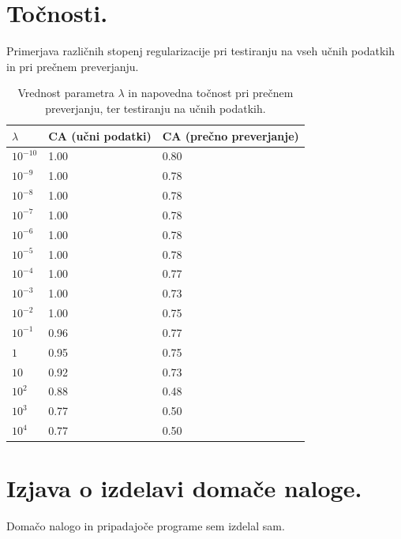 \documentclass[a4paper,11pt]{article}
\begin{document}
	

\section{Točnosti.} Primerjava različnih stopenj regularizacije pri testiranju na vseh učnih podatkih in pri prečnem preverjanju.
\begin{table}[htbp]
	\caption{Vrednost parametra $\lambda$ in napovedna točnost pri prečnem preverjanju, ter testiranju na učnih podatkih.}
	\label{tab1}
	\begin{center}
		\begin{tabular}{llp{4.3cm}}
			\hline
			 $\lambda$ & CA (učni podatki) & CA (prečno preverjanje) \\
			\hline
			$10^{-10}$ & 1.00  & 0.80 \\
			$10^{-9}$ & 1.00  & 0.78 \\
			$10^{-8}$ & 1.00  & 0.78 \\
			$10^{-7}$ & 1.00  & 0.78 \\
			$10^{-6}$ & 1.00  & 0.78 \\
			$10^{-5}$ & 1.00  & 0.78 \\
			$10^{-4}$ & 1.00  & 0.77 \\
			$10^{-3}$ & 1.00  & 0.73 \\
			$10^{-2}$ & 1.00  & 0.75 \\
			$10^{-1}$ & 0.96  & 0.77 \\
			$1$ & 0.95  & 0.75\\
			$10$ & 0.92  & 0.73\\
			$10^2$ & 0.88  & 0.48 \\
			$10^3$ & 0.77  & 0.50 \\
			$10^4$ & 0.77  & 0.50 \\
			\hline
		\end{tabular}
	\end{center}
\end{table}





\section{Izjava o izdelavi domače naloge.}
Domačo nalogo in pripadajoče programe sem izdelal sam.
\end{document}
